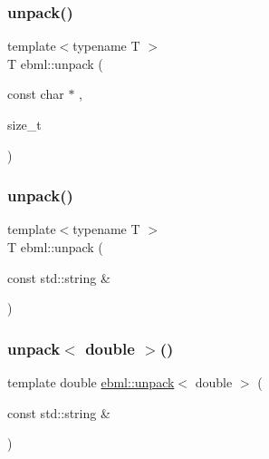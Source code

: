 \mbox{\label{namespaceebml_a55a0f9d0c93e80d488021fd03c4f3861}} 
\subsubsection{\texorpdfstring{unpack()}{unpack()}\hspace{0.1cm}{\footnotesize\ttfamily [1/2]}}
{\footnotesize\ttfamily template$<$typename T $>$ \\
T ebml\+::unpack (\begin{DoxyParamCaption}\item[{const char $\ast$}]{,  }\item[{size\+\_\+t}]{ }\end{DoxyParamCaption})}

\mbox{\label{namespaceebml_a33d2b669314c64b95ed6c37534b6b655}} 
\subsubsection{\texorpdfstring{unpack()}{unpack()}\hspace{0.1cm}{\footnotesize\ttfamily [2/2]}}
{\footnotesize\ttfamily template$<$typename T $>$ \\
T ebml\+::unpack (\begin{DoxyParamCaption}\item[{const std\+::string \&}]{ }\end{DoxyParamCaption})}

\mbox{\label{namespaceebml_af6f7324527703d090d8518b49776033a}} 
\subsubsection{\texorpdfstring{unpack$<$ double $>$()}{unpack< double >()}\hspace{0.1cm}{\footnotesize\ttfamily [1/2]}}
{\footnotesize\ttfamily template double \mbox{\hyperlink{namespaceebml_a55a0f9d0c93e80d488021fd03c4f3861}{ebml\+::unpack}}$<$ double $>$ (\begin{DoxyParamCaption}\item[{const std\+::string \&}]{ }\end{DoxyParamCaption})}

